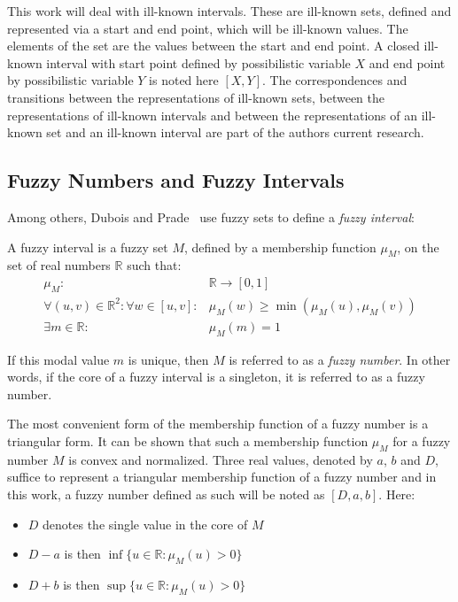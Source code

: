 This work will deal with ill-known intervals. These are ill-known sets, defined and represented via a start and end point, which will be ill-known values. The elements of the set are the values between the start and end point. A closed ill-known interval with start point defined by possibilistic variable $X$ and end point by possibilistic variable $Y$ is noted here $\left[X, Y\right]$. The correspondences and transitions between the representations of ill-known sets, between the representations of ill-known intervals and between the representations of an ill-known set and an ill-known interval are part of the authors current research.

\subsection{\label{subsec:fuzzy-numbers}Fuzzy Numbers and Fuzzy Intervals}
Among others, Dubois and Prade~\cite{Dubois1983} use fuzzy sets \cite{Zadeh1965} to define a \emph{fuzzy interval}:
\begin{definition}
A fuzzy interval is a fuzzy set $M$, defined by a membership function $\mu_{M}$, on the set of real numbers $\mathbb{R}$ such that:
\begin{eqnarray}
\mu_{M} : & \!\!\!\!\!\!\!\!\!\!\!\!\!\!\!\!\!\!\!\!\!\!\!\!\!\!\!\!\!\!\!\!\!\!\!\!\!\!\!\!\!\!\!\!\!\!\!\!\!\! \mathbb{R} \rightarrow \left[0,1\right] \nonumber \\ 
\forall (u,v)\in\mathbb{R}^2: \forall w \in [u,v]:&\mu_M(w) \geq\min(\mu_M(u),\mu_M(v))  \\
\exists m \in \mathbb{R} : & \!\!\!\!\!\!\!\!\!\!\!\!\!\!\!\!\!\!\!\!\!\!\!\!\!\!\!\!\!\!\!\!\!\!\!\!\!\!\!\!\!\!\!\!\!\!\!\! \mu_M(m)=1 
\end{eqnarray}
\end{definition}
If this modal value $m$ is unique, then $M$ is referred to as a \emph{fuzzy number}. In other words, if the core of a fuzzy interval is a singleton, it is referred to as a fuzzy number.

The most convenient form of the membership function of a fuzzy number is a triangular form. It can be shown that such a membership function $\mu_M$ for a fuzzy number $M$ is convex and normalized. Three real values, denoted by $a$, $b$ and $D$, suffice to represent a triangular membership function of a fuzzy number and in this work, a fuzzy number defined as such will be noted as $\left[D, a, b \right]$. Here:
\begin{itemize}
\item
$D$ denotes the single value in the core of $M$
\item
$D-a$ is then $\inf \{u \in \mathbb{R} : \mu_{M}(u) > 0\}$
\item
$D+b$ is then $\sup \{u \in \mathbb{R} : \mu_{M}(u) > 0\}$
\end{itemize}

